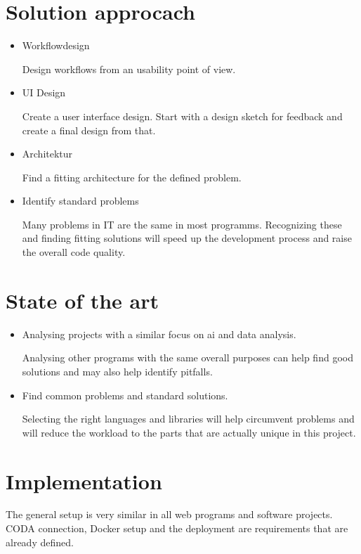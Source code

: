 \documentclass[12pt,a4paper,titlepage,oneside,BCOR1cm]{scrreprt}
\begin{document}
\section{Solution approcach}
\begin{itemize}
  \item Workflowdesign

  Design workflows from an usability point of view. 

  \item UI Design

  Create a user interface design. Start with a design sketch for feedback and create a final design from that.

  \item Architektur

  Find a fitting architecture for the defined problem.

  \item Identify standard problems

  Many problems in IT are the same in most programms. Recognizing these and finding fitting solutions will speed up the development process and raise the overall code quality. 
  
\end{itemize}

\section{State of the art}

\begin{itemize}
  \item Analysing projects with a similar focus on ai and data analysis.

  Analysing other programs with the same overall purposes can help find good solutions and may also help identify pitfalls.

  \item Find common problems and standard solutions. 
  
  Selecting the right languages and libraries will help circumvent problems and will reduce the workload to the parts that are actually unique in this project.
\end{itemize}

\section{Implementation}

The general setup is very similar in all web programs and software projects. CODA connection, Docker setup and the deployment are requirements that are already defined.
\end{document}
